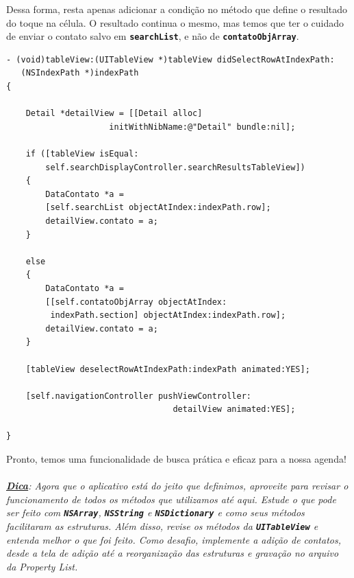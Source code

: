 \documentclass[a4paper,12pt,brazil,doubleside]{book}
\begin{document}
Dessa forma, resta apenas adicionar a condição no método que define o resultado do toque na célula. O resultado continua o mesmo, mas temos que ter o cuidado de enviar o contato salvo em \texttt{\textbf{searchList}}, e não de \texttt{\textbf{contatoObjArray}}.

\begin{listing}
\begin{verbatim}
- (void)tableView:(UITableView *)tableView didSelectRowAtIndexPath:
   (NSIndexPath *)indexPath
{

    Detail *detailView = [[Detail alloc]
                     initWithNibName:@"Detail" bundle:nil];
    
    if ([tableView isEqual:
        self.searchDisplayController.searchResultsTableView])
    {
        DataContato *a =
        [self.searchList objectAtIndex:indexPath.row];
        detailView.contato = a;
    }

    else
    {
        DataContato *a =
        [[self.contatoObjArray objectAtIndex:
         indexPath.section] objectAtIndex:indexPath.row];
        detailView.contato = a;
    }
    
    [tableView deselectRowAtIndexPath:indexPath animated:YES];
    
    [self.navigationController pushViewController:
                                  detailView animated:YES];
    
}
\end{verbatim}
\end{listing}

Pronto, temos uma funcionalidade de busca prática e eficaz para a nossa agenda!
\paragraph{}\textit{\textbf{\underline{Dica}}: Agora que o aplicativo está do jeito que definimos, aproveite para revisar o funcionamento de todos os métodos que utilizamos até aqui. Estude o que pode ser feito com \texttt{\textbf{NSArray}}, \texttt{\textbf{NSString}} e \texttt{\textbf{NSDictionary}} e como seus métodos facilitaram as estruturas. Além disso, revise os métodos da \texttt{\textbf{UITableView}} e entenda melhor o que foi feito. Como desafio, implemente a adição de contatos, desde a tela de adição até a reorganização das estruturas e gravação no arquivo da \emph{Property List}.}

\bigskip
\bigskip
\end{document}
